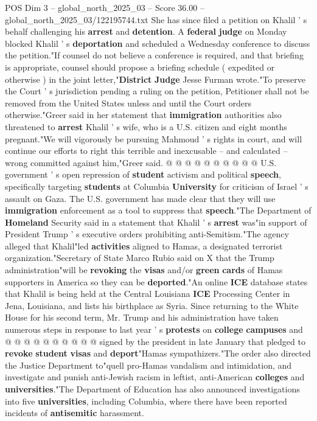 \begin{textsample}{POS Dim 3 – global\_north\_2025\_03 – Score 36.00 – global\_north\_2025\_03/122195744.txt}
She has since filed a petition on Khalil ' s behalf challenging his \textbf{arrest} and \textbf{detention}.
A \textbf{federal} \textbf{judge} on Monday blocked Khalil ' s \textbf{deportation} and scheduled a Wednesday conference to discuss the petition."If counsel do not believe a conference is required, and that briefing is appropriate, counsel should propose a briefing schedule ( expedited or otherwise ) in the joint letter,"\textbf{District} \textbf{Judge} Jesse Furman wrote."To preserve the Court ' s jurisdiction pending a ruling on the petition, Petitioner shall not be removed from the United States unless and until the Court orders otherwise."Greer said in her statement that \textbf{immigration} authorities also threatened to \textbf{arrest} Khalil ' s wife, who is a U.S. citizen and eight months pregnant."We will vigorously be pursuing Mahmoud ' s rights in court, and will continue our efforts to right this terrible and inexcusable -- and calculated -- wrong committed against him,"Greer said. @ @ @ @ @ @ @ @ @ @ U.S. government ' s open repression of \textbf{student} activism and political \textbf{speech}, specifically targeting \textbf{students} at Columbia \textbf{University} for criticism of Israel ' s assault on Gaza.
The U.S. government has made clear that they will use \textbf{immigration} enforcement as a tool to suppress that \textbf{speech}."The Department of \textbf{Homeland} Security said in a statement that Khalil ' s \textbf{arrest} was"in support of President Trump ' s executive orders prohibiting anti-Semitism."The agency alleged that Khalil"led \textbf{activities} aligned to Hamas, a designated terrorist organization."Secretary of State Marco Rubio said on X that the Trump administration"will be \textbf{revoking} the \textbf{visas} and/or \textbf{green} \textbf{cards} of Hamas supporters in America so they can be \textbf{deported}."An online \textbf{ICE} database states that Khalil is being held at the Central Louisiana \textbf{ICE} Processing Center in Jena, Louisiana, and lists his birthplace as Syria.
Since returning to the White House for his second term, Mr.
Trump and his administration have taken numerous steps in response to last year ' s \textbf{protests} on \textbf{college} \textbf{campuses} and @ @ @ @ @ @ @ @ @ @ signed by the president in late January that pledged to \textbf{revoke} \textbf{student} \textbf{visas} and \textbf{deport}"Hamas sympathizers."The order also directed the Justice Department to"quell pro-Hamas vandalism and intimidation, and investigate and punish anti-Jewish racism in leftist, anti-American \textbf{colleges} and \textbf{universities}."The Department of Education has also announced investigations into five \textbf{universities}, including Columbia, where there have been reported incidents of \textbf{antisemitic} harassment.

\end{textsample}

